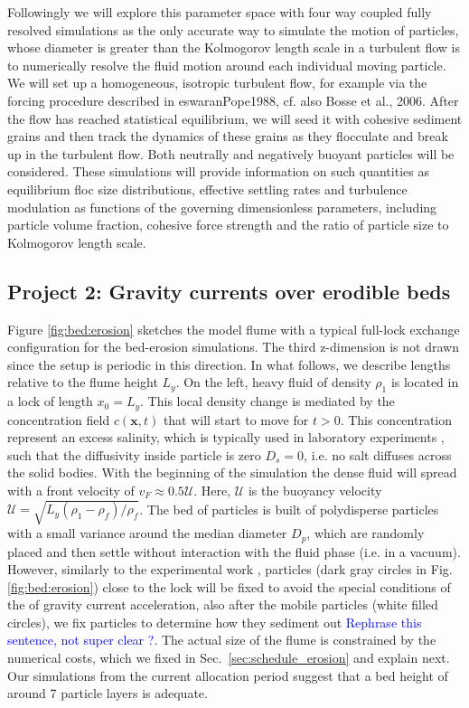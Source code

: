 \documentclass[10pt]{article}
\newcommand{\ro}{\textcolor{blue}}
\begin{document}
  Followingly we will explore this parameter space  with four way coupled fully resolved simulations as the only accurate way to simulate the motion of particles, whose diameter is greater than the Kolmogorov length scale in a turbulent flow is to numerically resolve the fluid motion around each individual moving particle. We will set up a homogeneous, isotropic turbulent flow, for example via the forcing procedure described in eswaranPope1988, cf. also Bosse et al., 2006. After the flow has reached statistical equilibrium, we will seed it with cohesive sediment grains and then track the dynamics of these grains as they flocculate and break up in the turbulent flow. Both neutrally and negatively buoyant particles will be considered. These simulations will provide information on such quantities as equilibrium floc size distributions, effective settling rates and turbulence modulation as functions of the governing dimensionless parameters, including particle volume fraction, cohesive force strength and the ratio of particle size to Kolmogorov length scale.


\subsection*{Project 2: Gravity currents over erodible beds} 
\label{sec:erosion}

Figure \ref{fig:bed:erosion} sketches the model flume with a typical full-lock exchange configuration for the bed-erosion simulations. The third z-dimension is not drawn since the setup is  periodic in this direction. In what follows, we describe  lengths  relative to the flume height $L_y$. 
 On the left,  heavy fluid of density $\rho_1$ is located in a lock of length $x_0=L_y$. This local density change is mediated by the concentration field $c(\mathbf x,t)$ that will start to move for $t>0$. This concentration represent an excess salinity, which is typically used in laboratory experiments \citep{zordan2018}, such that the diffusivity  inside particle is zero $D_s=0$, i.e. no salt diffuses across the solid bodies.  With the beginning of the simulation the dense fluid will spread with a front velocity of $v_F \approx 0.5 \mathcal U$. Here, $\mathcal U$ is the buoyancy velocity $\mathcal U = \sqrt{L_y(\rho_1-\rho_f)/\rho_f }$.
 The bed of particles is built of polydisperse particles with a small variance around the median diameter $D_p$, which are randomly placed and  then  settle without interaction with the fluid phase (i.e. in a vacuum). However, similarly to the experimental work \citep{zordan2018},  particles (dark gray circles in Fig.\ref{fig:bed:erosion})  close to the lock will be fixed to avoid the special conditions of the  of gravity current acceleration, also after the mobile particles (white filled circles), we fix particles to determine how they sediment out \ro{Rephrase this sentence, not super clear ?}. The actual size of the flume is constrained by the numerical costs, which we fixed in Sec.~\ref{sec:schedule_erosion}  and explain next. Our simulations from the current allocation period suggest that a bed  height of around 7 particle layers is adequate. 
 
\end{document}
